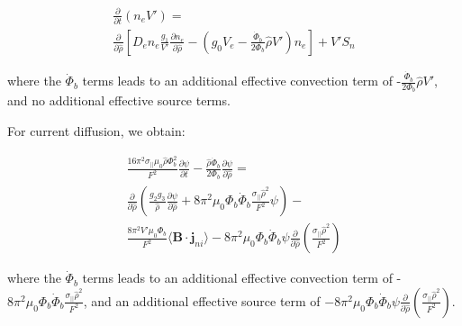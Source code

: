 \documentclass[aps, reprint, nofootinbib]{revtex4-2}
\newcommand{\rnorm}{\hat{\rho}}
\newcommand{\phibdot}{\dot{\Phi}_b}
\newcommand{\phib}{\Phi_b}
\begin{document}
\begin{multline}
\label{eq:ne_rearranged}
\frac{\partial}{\partial t}\left( n_e V' \right) = \\ \frac{\partial}{\partial \rnorm} \left[D_e n_e \frac{g_1}{V'} \frac{\partial n_e}{\partial \rnorm} - \left( g_0V_e - \frac{\phibdot}{2\phib}\rnorm V'\right) n_e\right] + V'S_n
\end{multline}   

where the $\phibdot$ terms leads to an additional effective convection term of -$\frac{\phibdot}{2\phib}\rnorm V'$, and no additional effective source terms.

For current diffusion, we obtain:

\begin{multline}
    \label{eq:psi_rearranged}
 \frac{16 \pi^2 \sigma_{||}\mu_0 \rnorm \phib^2}{F^2}\frac{\partial \psi}{\partial t}-\frac{\rnorm\phibdot}{2\phib}\frac{\partial \psi}{\partial \rnorm}  = \\ \frac{\partial}{\partial \rnorm} \left( \frac{g_2 g_3}{\rnorm} \frac{\partial \psi}{\partial \rnorm} +8 \pi^2 \mu_0 \phib\phibdot\frac{\sigma_{||}\rnorm^2}{F^2}\psi\right) - \\ \frac{8\pi^2 V' \mu_0 \phib}{F^2} \langle \mathbf{B} \cdot \mathbf{j}_{ni} \rangle - 8 \pi^2 \mu_0 \phib\phibdot\psi\frac{\partial}{\partial \rnorm}\left(\frac{\sigma_{||}\rnorm^2}{F^2}\right)
\end{multline} 

where the $\phibdot$ terms leads to an additional effective convection term of - $8 \pi^2 \mu_0 \phib\phibdot\frac{\sigma_{||}\rnorm^2}{F^2}$, and an additional effective source term of $- 8 \pi^2 \mu_0 \phib\phibdot\psi\frac{\partial}{\partial \rnorm}\left(\frac{\sigma_{||}\rnorm^2}{F^2}\right)$.


\end{document}
